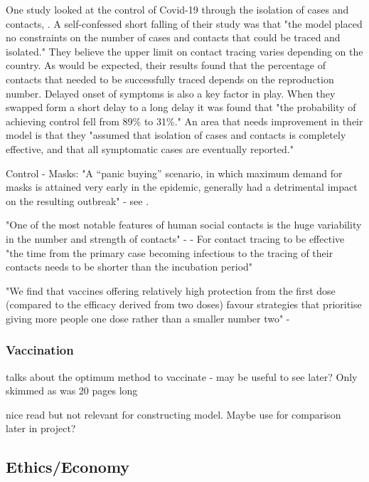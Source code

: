 \documentclass[a4paper,11pt]{article}
\theoremstyle{plain}
\theoremstyle{definition}
\begin{document}
One study looked at the control of Covid-19 through the isolation of cases and contacts, \citep{ControlIsolation}. A self-confessed short falling of their study was that "the model placed no
constraints on the number of cases and contacts that
could be traced and isolated." They believe the upper limit on contact tracing varies depending on the country. As would be expected, their results found that the percentage of contacts that needed to be successfully traced depends on the reproduction number. Delayed onset of symptoms is also a key factor in play. When they swapped form a short delay to a long delay it was found that "the probability of achieving
control fell from 89\% to 31\%." An area that needs improvement in their model is that they "assumed
that isolation of cases and contacts is completely
effective, and that all symptomatic cases are eventually
reported."

Control - Masks: "A “panic buying” scenario, in
which maximum demand for masks is attained very early in the
epidemic, generally had a detrimental impact on the resulting
outbreak" - see \citep{ControlFMRA}.

"One of the most notable features of human social contacts is the huge variability in the number and
strength of contacts" - \citep{WarwickCT} - For contact tracing to be effective "the time from the primary case becoming infectious to the tracing of their
contacts needs to be shorter than the incubation period"

"We find that vaccines offering relatively high protection from the first dose (compared
to the efficacy derived from two doses) favour strategies that prioritise giving more people one dose
rather than a smaller number two" - \citep{WarwickVaccCount}

\subsubsection{Vaccination}

\citep{WarwickVaccStrat} talks about the optimum method to vaccinate - may be useful to see later? Only skimmed as was 20 pages long

\citep{WarwickNonPharm} nice read but not relevant for constructing model. Maybe use for comparison later in project?


\subsection{Ethics/Economy}
\end{document}
